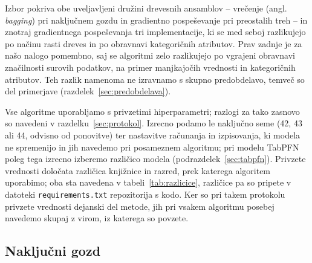 \documentclass[a4paper,12pt,openright]{book}
\begin{document}
Izbor pokriva obe uveljavljeni družini drevesnih ansamblov -- vrečenje
(angl. \emph{bagging}) pri naključnem gozdu in gradientno pospeševanje
pri preostalih treh -- in znotraj
gradientnega pospeševanja tri implementacije, ki se med seboj razlikujejo po
načinu rasti dreves in po obravnavi kategoričnih atributov. Prav zadnje je za
našo nalogo pomembno, saj se algoritmi zelo razlikujejo po vgrajeni obravnavi
značilnosti surovih podatkov, na primer manjkajočih vrednosti in kategoričnih
atributov. Teh razlik namenoma ne izravnamo s skupno
predobdelavo, temveč so del primerjave (razdelek~\ref{sec:predobdelava}).

Vse algoritme uporabljamo s privzetimi hiperparametri; razlogi za tako zasnovo
so navedeni v razdelku~\ref{sec:protokol}. Izrecno podamo le naključno seme
(42, 43 ali 44, odvisno od ponovitve) ter nastavitve
računanja in izpisovanja, ki modela ne spremenijo in jih navedemo pri
posameznem algoritmu; pri modelu TabPFN poleg tega izrecno izberemo različico
modela (podrazdelek~\ref{sec:tabpfn}). Privzete vrednosti določata različica
knjižnice in razred, prek katerega algoritem uporabimo; oba sta navedena v
tabeli~\ref{tab:razlicice}, različice pa so pripete v datoteki
\texttt{requirements.txt} repozitorija s kodo. Ker so pri takem
protokolu privzete vrednosti dejanski del metode, jih pri vsakem algoritmu
posebej navedemo skupaj z virom, iz katerega so povzete.



\subsection{Naključni gozd}
\label{sec:rf}
\end{document}
